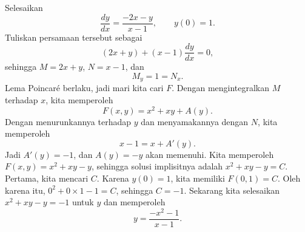 \begin{example} \label{exact:exactR2example}
Selesaikan
\begin{equation*}
\frac{dy}{dx} = \frac{-2x-y}{x-1}, \qquad y(0) = 1.
\end{equation*}
Tuliskan persamaan tersebut sebagai
\begin{equation*}
(2x+y) + (x-1)\frac{dy}{dx} = 0 ,
\end{equation*}
sehingga $M = 2x+y$, $N = x-1$, dan
\begin{equation*}
M_y = 1 = N_x .
\end{equation*}
Lema Poincar\'e berlaku, jadi mari kita cari $F$.
Dengan mengintegralkan $M$ terhadap $x$, kita memperoleh
\begin{equation*}
F(x,y) = x^2+xy + A(y) .
\end{equation*}
Dengan menurunkannya terhadap $y$ dan menyamakannya dengan $N$, kita memperoleh
\begin{equation*}
x-1 = x + A'(y) .
\end{equation*}
Jadi $A'(y) = -1$, dan $A(y) = -y$ akan memenuhi.  Kita memperoleh $F(x,y) = x^2+xy-y$, sehingga
solusi implisitnya adalah $x^2+xy-y = C$.  Pertama, kita mencari $C$.  Karena $y(0)=1$, kita memiliki
$F(0,1) = C$.  Oleh karena itu, $0^2+0\times 1 - 1 = C$, sehingga $C=-1$.  Sekarang kita selesaikan
$x^2+xy-y = -1$ untuk $y$ dan memperoleh
\begin{equation*}
y = \frac{-x^2-1}{x-1} .
\end{equation*}
\end{example}

